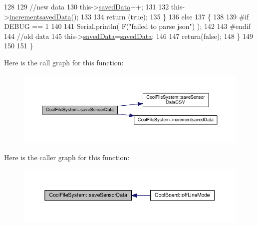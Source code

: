 \begin{DoxyCode}
128 
129         \textcolor{comment}{//new data}
130         this->\hyperlink{class_cool_file_system_ad9f5b739a32100f5f21270c3d9ee2b1d}{savedData}++;
131 
132         this->\hyperlink{class_cool_file_system_aae045125288f255f3e258073dcada2a6}{incrementsavedData}();
133         
134         \textcolor{keywordflow}{return} (\textcolor{keyword}{true});      
135     \}
136     \textcolor{keywordflow}{else}
137     \{
138     
139 \textcolor{preprocessor}{    #if DEBUG == 1}
140 
141         Serial.println( F(\textcolor{stringliteral}{"failed to parse json"}) );
142     
143 \textcolor{preprocessor}{    #endif}
144         \textcolor{comment}{//old data}
145         this->\hyperlink{class_cool_file_system_ad9f5b739a32100f5f21270c3d9ee2b1d}{savedData}=\hyperlink{class_cool_file_system_ad9f5b739a32100f5f21270c3d9ee2b1d}{savedData};
146 
147         \textcolor{keywordflow}{return}(\textcolor{keyword}{false});
148     \}
149     
150 
151 \}
\end{DoxyCode}
Here is the call graph for this function\+:
\nopagebreak
\begin{figure}[H]
\begin{center}
\leavevmode
\includegraphics[width=350pt]{db/d0c/class_cool_file_system_afa3a4feae94871d4d3b6bebb701c2e67_cgraph}
\end{center}
\end{figure}
Here is the caller graph for this function\+:
\nopagebreak
\begin{figure}[H]
\begin{center}
\leavevmode
\includegraphics[width=350pt]{db/d0c/class_cool_file_system_afa3a4feae94871d4d3b6bebb701c2e67_icgraph}
\end{center}
\end{figure}
\mbox{\label{class_cool_file_system_ab78704d5d21ce10fc6f1138ab5ab46c8}} 
